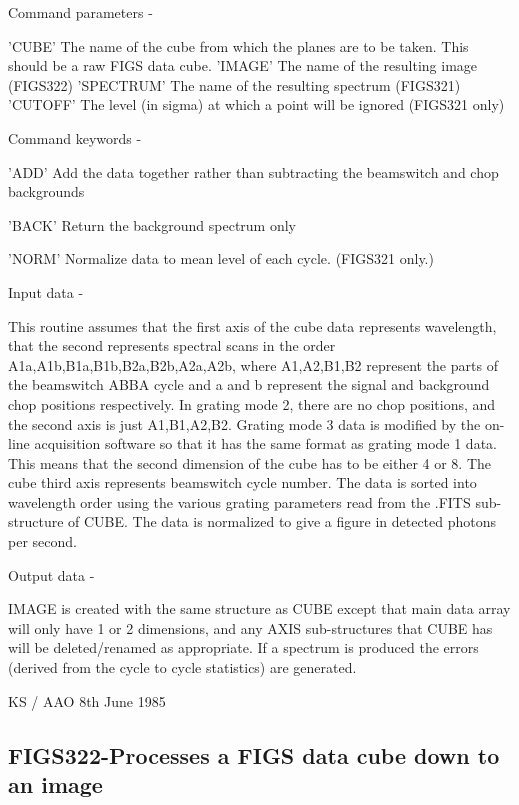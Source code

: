 \begin{description}
\begin{description}
\begin{terminalv}
 Command parameters -

 'CUBE'     The name of the cube from which the planes
            are to be taken.  This should be a raw FIGS data
            cube.
 'IMAGE'    The name of the resulting image (FIGS322)
 'SPECTRUM' The name of the resulting spectrum (FIGS321)
 'CUTOFF'   The level (in sigma) at which a point will
            be ignored (FIGS321 only)

 Command keywords -

 'ADD'      Add the data together rather than subtracting the
            beamswitch and chop backgrounds

 'BACK'     Return the background spectrum only

 'NORM'     Normalize data to mean level of each cycle.
            (FIGS321 only.)

 Input data -

 This routine assumes that the first axis of the cube data
 represents wavelength, that the second represents spectral
 scans in the order A1a,A1b,B1a,B1b,B2a,B2b,A2a,A2b, where
 A1,A2,B1,B2 represent the parts of the beamswitch ABBA cycle
 and a and b represent the signal and background chop positions
 respectively.  In grating mode 2, there are no chop positions,
 and the second axis is just A1,B1,A2,B2. Grating mode 3 data
 is modified by the on-line acquisition software so that it
 has the same format as grating mode 1 data.  This means that the
 second dimension of the cube has to be either 4 or 8.  The
 cube third axis represents beamswitch cycle number.
 The data is sorted into wavelength order using the various
 grating parameters read from the .FITS sub-structure of CUBE.
 The data is normalized to give a figure in detected photons
 per second.

 Output data -

 IMAGE is created with the same structure as CUBE
 except that main data array will only have 1 or 2 dimensions, and any
 AXIS sub-structures that CUBE has will be deleted/renamed
 as appropriate. If a spectrum is produced the errors (derived from
 the cycle to cycle statistics) are generated.

                                 KS / AAO 8th June 1985
\end{terminalv}
\end{description}
\subsection{FIGS322-\label{FIGS322}Processes a FIGS data cube down to an image}
\begin{description}


\end{description}
\end{description}
